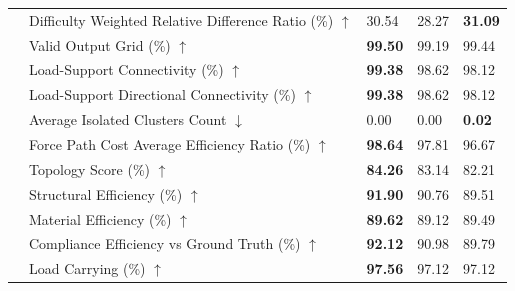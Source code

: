\begin{table}[!h]
{\begin{tabular}{lllll}
 & Difficulty Weighted Relative Difference Ratio (\%) $\uparrow$ & 30.54 & 28.27 & \textbf{31.09} \\
 & Valid Output Grid (\%) $\uparrow$ & \textbf{99.50} & 99.19 & 99.44 \\
 & Load-Support Connectivity (\%) $\uparrow$ & \textbf{99.38} & 98.62 & 98.12 \\
 & Load-Support Directional Connectivity (\%) $\uparrow$ & \textbf{99.38} & 98.62 & 98.12 \\
 & Average Isolated Clusters Count $\downarrow$ & 0.00 & 0.00 & \textbf{0.02} \\
 & Force Path Cost Average Efficiency Ratio (\%) $\uparrow$ & \textbf{98.64} & 97.81 & 96.67 \\
 & Topology Score (\%) $\uparrow$ & \textbf{84.26} & 83.14 & 82.21 \\
 & Structural Efficiency (\%) $\uparrow$ & \textbf{91.90} & 90.76 & 89.51 \\
 & Material Efficiency (\%) $\uparrow$ & \textbf{89.62} & 89.12 & 89.49 \\
 & Compliance Efficiency vs Ground Truth (\%) $\uparrow$ & \textbf{92.12} & 90.98 & 89.79 \\
 & Load Carrying (\%) $\uparrow$ & \textbf{97.56} & 97.12 & 97.12 \\
    \bottomrule
  \end{tabular}
  }
\end{table}